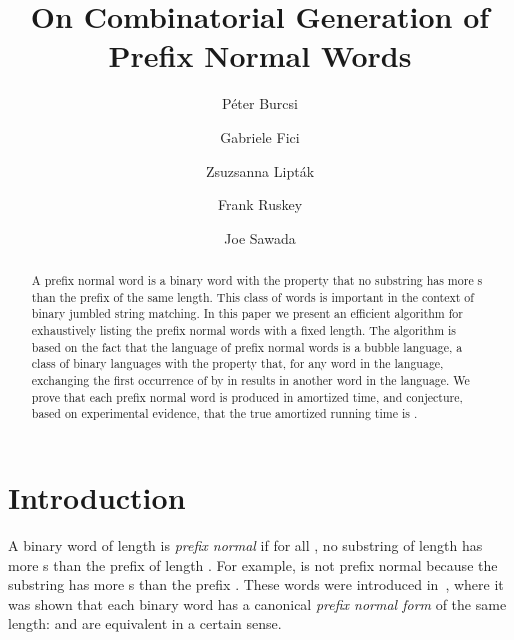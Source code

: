 \documentclass[11pt,a4paper]{llncs}
\begin{document}
\title{On Combinatorial Generation of Prefix Normal Words}


\author{P\'eter Burcsi \and Gabriele Fici \and Zsuzsanna Lipt\'ak \and Frank Ruskey \and Joe Sawada}



\date{}

\maketitle

\begin{abstract}
A prefix normal word is a binary word with the property that no substring has more s than the prefix of the same length. This class of words is important in the context of binary jumbled string matching. In this paper we present an efficient algorithm for exhaustively listing the prefix normal words with a fixed length. The algorithm is based on the fact that the language of prefix normal words is a bubble language, a class of binary languages with the property that, for any word  in the language, exchanging the first occurrence of  by  in  results in another word in the language. We prove that each prefix normal word is produced in  amortized time, and conjecture, based on experimental evidence, that the true amortized running time is . 
\end{abstract}

\section{Introduction}


A binary word of length  is {\em prefix normal} if for all , no substring of length  has more s than the prefix of length . For example,  is not prefix normal because the substring  has more s than the prefix . These words were introduced in~\cite{FL11}, where it was shown that each binary word  has a canonical {\em prefix normal form}  of the same length:  and  are equivalent in a certain sense. 
\end{document}
